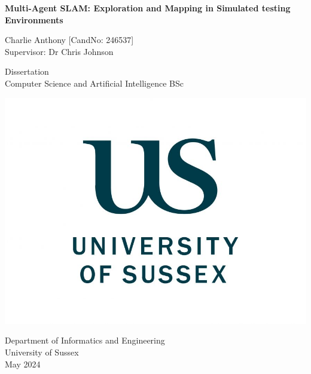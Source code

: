 \documentclass[12pt]{article}
\begin{document}
\begin{titlepage}
    \centering
    \vspace*{5cm}

    \Large
    \textbf{Multi-Agent SLAM: Exploration and Mapping in Simulated testing Environments}

    \vspace{1cm}

    Charlie Anthony [CandNo: 246537]\\
    Supervisor: Dr Chris Johnson



    \vfill

    \vspace{1cm}

    \small
    Dissertation\\
    Computer Science and Artificial Intelligence BSc

    \includegraphics[width=0.3\linewidth]{sussex_logo.jpg}


    \small
    Department of Informatics and Engineering\\
    University of Sussex\\
    May 2024
\end{titlepage}

\tableofcontents
\newpage

\end{document}

